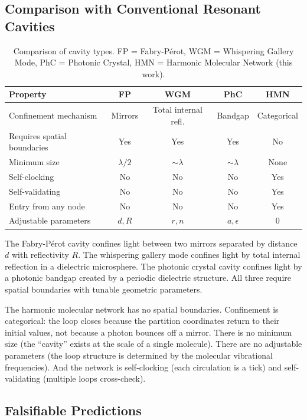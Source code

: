 \documentclass[11pt,a4paper]{article}
\theoremstyle{definition}
\theoremstyle{remark}
\begin{document}
\subsection{Comparison with Conventional Resonant Cavities}

\begin{table}[H]
\centering
\caption{Comparison of cavity types. FP = Fabry-P\'{e}rot, WGM = Whispering Gallery Mode, PhC = Photonic Crystal, HMN = Harmonic Molecular Network (this work).}
\label{tab:cavity_comparison}
\begin{tabular}{@{}lcccc@{}}
\toprule
Property & FP & WGM & PhC & HMN \\
\midrule
Confinement mechanism & Mirrors & Total internal refl. & Bandgap & Categorical \\
Requires spatial boundaries & Yes & Yes & Yes & No \\
Minimum size & $\lambda/2$ & $\sim \lambda$ & $\sim \lambda$ & None \\
Self-clocking & No & No & No & Yes \\
Self-validating & No & No & No & Yes \\
Entry from any node & No & No & No & Yes \\
Adjustable parameters & $d, R$ & $r, n$ & $a, \epsilon$ & 0 \\
\bottomrule
\end{tabular}
\end{table}

The Fabry-P\'{e}rot cavity \citep{fabry1899, siegman1986} confines light between two mirrors separated by distance $d$ with reflectivity $R$. The whispering gallery mode \citep{vahala2003} confines light by total internal reflection in a dielectric microsphere. The photonic crystal cavity \citep{noda2007, joannopoulos2008} confines light by a photonic bandgap created by a periodic dielectric structure. All three require spatial boundaries with tunable geometric parameters.

The harmonic molecular network has no spatial boundaries. Confinement is categorical: the loop closes because the partition coordinates return to their initial values, not because a photon bounces off a mirror. There is no minimum size (the ``cavity'' exists at the scale of a single molecule). There are no adjustable parameters (the loop structure is determined by the molecular vibrational frequencies). And the network is self-clocking (each circulation is a tick) and self-validating (multiple loops cross-check).

\subsection{Falsifiable Predictions}
\end{document}
